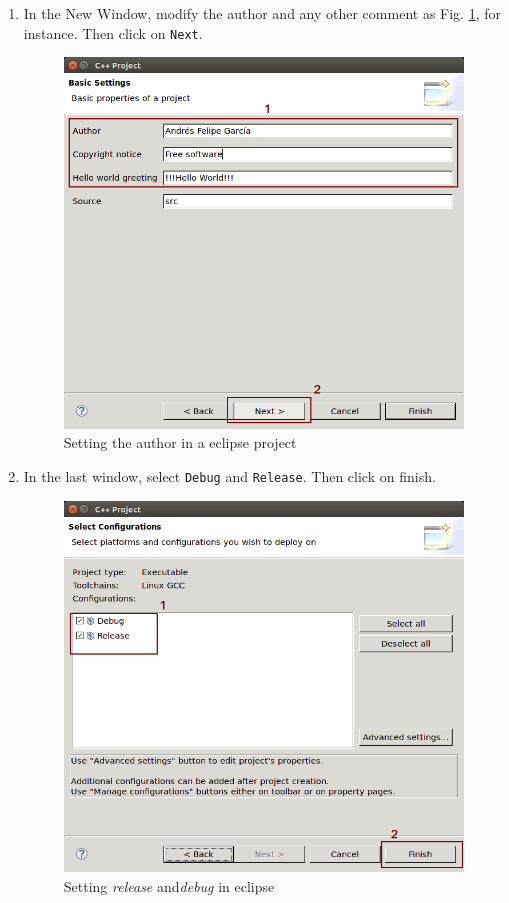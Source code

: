 \documentclass[12pt, oneside]{book}              %
\begin{document}
\begin{enumerate}
\item In the New Window, modify the author and any other comment as Fig. \ref{fig:Eclipse_setting_2},
for instance. Then click on \texttt{Next}.

\begin{figure}[h]
\centering
\includegraphics[width=0.6\linewidth]{./Imags_Doc/Eclipse_setting_2}
\caption[Setting the author in a eclipse project]{Setting the author in a eclipse project}
\label{fig:Eclipse_setting_2}
\end{figure}

\item In the last window, select \texttt{Debug} and \texttt{Release}. Then click on finish.

\begin{figure}[h]
\centering
\includegraphics[width=0.6\linewidth]{./Imags_Doc/Eclipse_setting_3}
\caption[Setting \textit{release} and \textit{debug} in eclipse]{Setting \textit{release} and\textit{debug} in eclipse}
\label{fig:Eclipse_setting_3}
\end{figure}


\end{enumerate}
\end{document}
